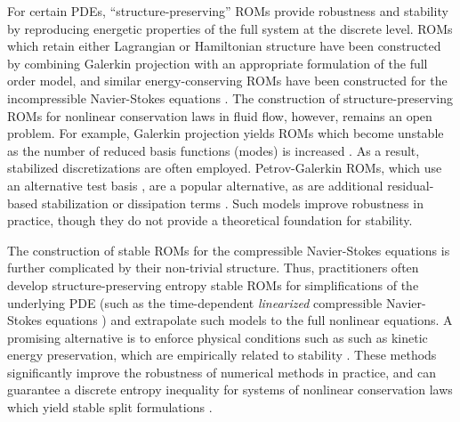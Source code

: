 \documentclass[preprint,10pt]{elsarticle}
\theoremstyle{definition}
\theoremstyle{lemma}
\theoremstyle{theorem}
\theoremstyle{assumption}
\begin{document}
For certain PDEs, ``structure-preserving'' ROMs provide robustness and stability by reproducing energetic properties of the full system at the discrete level.  ROMs which retain either Lagrangian \cite{lall2003structure, carlberg2015preserving} or Hamiltonian structure \cite{benner2012interpolation, gugercin2012structure, peng2016symplectic, chaturantabut2016structure, gong2017structure, afkham2017structure, afkham2018structure} have been constructed by combining Galerkin projection with an appropriate formulation of the full order model, and similar energy-conserving ROMs have been constructed for the incompressible Navier-Stokes equations \cite{farhat2014dimensional, farhat2015structure}.  The construction of structure-preserving ROMs for nonlinear conservation laws in fluid flow, however, remains an open problem.  For example, Galerkin projection yields ROMs which become unstable as the number of reduced basis functions (modes) is increased \cite{bui2007goal, carlberg2013gnat}.  As a result, stabilized discretizations are often employed.  Petrov-Galerkin ROMs, which use an alternative test basis \cite{maday2002blackbox, rozza2007stability, bui2007goal, serre2012reliable, amsallem2012stabilization, rozza2013reduced, ballarin2015supremizer, carlberg2017galerkin}, are a popular alternative, as are additional residual-based stabilization or dissipation terms \cite{wang2012proper, kalashnikova2014stabilization, caiazzo2014numerical, balajewicz2016minimal}.  Such models improve robustness in practice, though they do not provide a theoretical foundation for stability.  

The construction of stable ROMs for the compressible Navier-Stokes equations is further complicated by their non-trivial structure.  Thus, practitioners often develop structure-preserving entropy stable ROMs for simplifications of the underlying PDE (such as the time-dependent \textit{linearized} compressible Navier-Stokes equations \cite{barone2009stable, kalashnikova2010stability, amsallem2012stabilization, kalashnikova2014construction}) and extrapolate such models to the full nonlinear equations.  A promising alternative is to enforce physical conditions such as such as kinetic energy preservation, which are empirically related to stability \cite{maboudi2018conservative}.  These methods significantly improve the robustness of numerical methods in practice, and can guarantee a discrete entropy inequality for systems of nonlinear conservation laws which yield stable split formulations \cite{fisher2013discretely}.  
\end{document}
